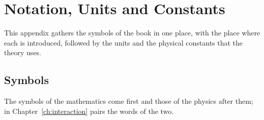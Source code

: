 \chapter{Notation, Units and Constants}\label{app:notation}

This appendix gathers the symbols of the book in one place, with the place where each is introduced, followed by the units and the physical constants that the theory uses.

\section{Symbols}\label{app:symbols}

The symbols of the mathematics come first and those of the physics after them;  in Chapter~\ref{ch:interaction} pairs the words of the two.

